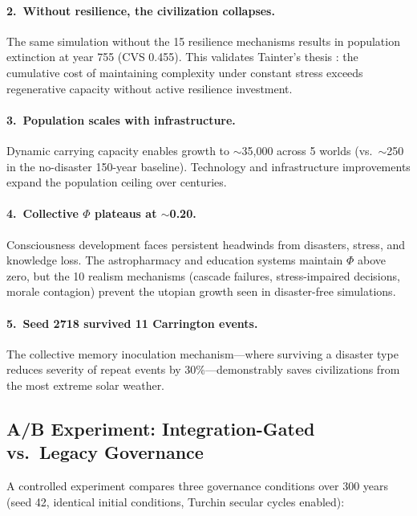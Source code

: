 \documentclass[12pt,a4paper]{article}
\begin{document}
\paragraph{2.\ Without resilience, the civilization collapses.} The same simulation without the 15 resilience mechanisms results in population extinction at year 755 (CVS 0.455). This validates Tainter's thesis \citep{tainter1988collapse}: the cumulative cost of maintaining complexity under constant stress exceeds regenerative capacity without active resilience investment.

\paragraph{3.\ Population scales with infrastructure.} Dynamic carrying capacity enables growth to $\sim$35,000 across 5 worlds (vs.\ $\sim$250 in the no-disaster 150-year baseline). Technology and infrastructure improvements expand the population ceiling over centuries.

\paragraph{4.\ Collective $\Phi$ plateaus at $\sim$0.20.} Consciousness development faces persistent headwinds from disasters, stress, and knowledge loss. The astropharmacy and education systems maintain $\Phi$ above zero, but the 10 realism mechanisms (cascade failures, stress-impaired decisions, morale contagion) prevent the utopian growth seen in disaster-free simulations.

\paragraph{5.\ Seed 2718 survived 11 Carrington events.} The collective memory inoculation mechanism---where surviving a disaster type reduces severity of repeat events by 30\%---demonstrably saves civilizations from the most extreme solar weather.

\subsection{A/B Experiment: Integration-Gated vs.\ Legacy Governance}

A controlled experiment compares three governance conditions over 300 years (seed 42, identical initial conditions, Turchin secular cycles enabled):
\end{document}

